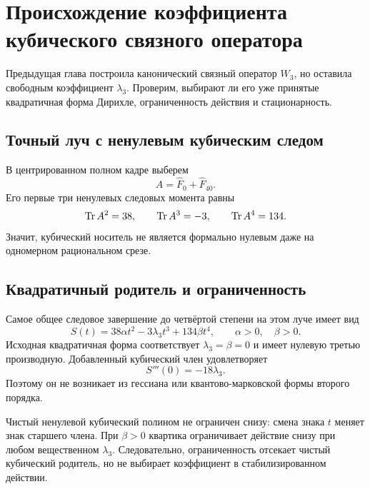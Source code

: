 \chapter{Происхождение коэффициента кубического связного оператора}
\label{ch:v8-baryon-cubic-trace-parent-action-coefficient-origin-no-go-gate}

Предыдущая глава построила канонический связный оператор $W_3$, но оставила
свободным коэффициент $\lambda_3$. Проверим, выбирают ли его уже принятые
квадратичная форма Дирихле, ограниченность действия и стационарность.

\section{Точный луч с ненулевым кубическим следом}

В центрированном полном кадре выберем
\begin{equation}
 A=\widehat F_0+\widehat F_{40}.
 \label{eq:v8-baryon-cubic-coefficient-test-ray}
\end{equation}
Его первые три ненулевых следовых момента равны
\begin{equation}
 \operatorname{Tr} A^2=38,\qquad \operatorname{Tr} A^3=-3,\qquad \operatorname{Tr} A^4=134.
 \label{eq:v8-baryon-cubic-coefficient-ray-moments}
\end{equation}
Значит, кубический носитель не является формально нулевым даже на
одномерном рациональном срезе.

\section{Квадратичный родитель и ограниченность}

Самое общее следовое завершение до четвёртой степени на этом луче имеет вид
\begin{equation}
 S(t)=38\alpha t^2-3\lambda_3t^3+134\beta t^4,
 \qquad \alpha>0,\quad\beta>0.
 \label{eq:v8-baryon-cubic-coefficient-ray-action}
\end{equation}
Исходная квадратичная форма соответствует $\lambda_3=\beta=0$ и имеет
нулевую третью производную. Добавленный кубический член удовлетворяет
\begin{equation}
 S'''(0)=-18\lambda_3.
 \label{eq:v8-baryon-cubic-coefficient-third-derivative}
\end{equation}
Поэтому он не возникает из гессиана или квантово-марковской формы второго
порядка.

Чистый ненулевой кубический полином не ограничен снизу: смена знака $t$
меняет знак старшего члена. При $\beta>0$ квартика ограничивает действие
снизу при любом вещественном $\lambda_3$. Следовательно, ограниченность
отсекает чистый кубический родитель, но не выбирает коэффициент в
стабилизированном действии.

